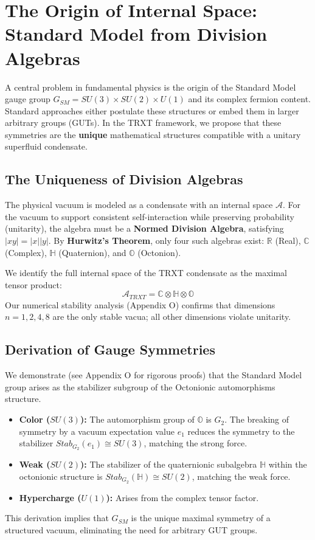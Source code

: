 \documentclass[a4paper,12pt]{article}
\begin{document}
\section{The Origin of Internal Space: Standard Model from Division Algebras}
\label{sec:division_algebras}

A central problem in fundamental physics is the origin of the Standard Model gauge group $G_{SM} = SU(3) \times SU(2) \times U(1)$ and its complex fermion content. Standard approaches either postulate these structures or embed them in larger arbitrary groups (GUTs). 
In the TRXT framework, we propose that these symmetries are the \textbf{unique} mathematical structures compatible with a unitary superfluid condensate.

\subsection{The Uniqueness of Division Algebras}
The physical vacuum is modeled as a condensate with an internal space $\mathcal{A}$. For the vacuum to support consistent self-interaction while preserving probability (unitarity), the algebra must be a \textbf{Normed Division Algebra}, satisfying $|xy| = |x||y|$. 
By \textbf{Hurwitz's Theorem}, only four such algebras exist: $\mathbb{R}$ (Real), $\mathbb{C}$ (Complex), $\mathbb{H}$ (Quaternion), and $\mathbb{O}$ (Octonion).

We identify the full internal space of the TRXT condensate as the maximal tensor product:
\begin{equation}
    \mathcal{A}_{TRXT} = \mathbb{C} \otimes \mathbb{H} \otimes \mathbb{O}
\end{equation}
Our numerical stability analysis (Appendix O) confirms that dimensions $n=1, 2, 4, 8$ are the only stable vacua; all other dimensions violate unitarity.

\subsection{Derivation of Gauge Symmetries}
We demonstrate (see Appendix O for rigorous proofs) that the Standard Model group arises as the stabilizer subgroup of the Octonionic automorphisms structure.
\begin{itemize}
    \item \textbf{Color ($SU(3)$):} The automorphism group of $\mathbb{O}$ is $G_2$. The breaking of symmetry by a vacuum expectation value $e_1$ reduces the symmetry to the stabilizer $Stab_{G_2}(e_1) \cong SU(3)$, matching the strong force.
    \item \textbf{Weak ($SU(2)$):} The stabilizer of the quaternionic subalgebra $\mathbb{H}$ within the octonionic structure is $Stab_{G_2}(\mathbb{H}) \cong SU(2)$, matching the weak force.
    \item \textbf{Hypercharge ($U(1)$):} Arises from the complex tensor factor.
\end{itemize}
This derivation implies that $G_{SM}$ is the unique maximal symmetry of a structured vacuum, eliminating the need for arbitrary GUT groups.
\end{document}
